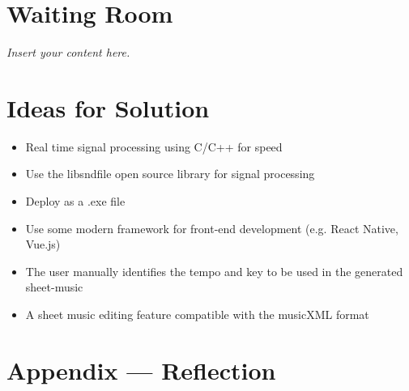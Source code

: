 \documentclass[12pt]{article}
\newcommand{\lips}{\textit{Insert your content here.}}
\begin{document}
\section{Waiting Room}

\lips

\section{Ideas for Solution}
\begin{itemize}
  \item Real time signal processing using C/C++ for speed
  \item Use the libsndfile open source library for signal processing
  \item Deploy as a .exe file
  \item Use some modern framework for front-end development (e.g. React Native, Vue.js)
  \item The user manually identifies the tempo and key to be used in the generated sheet-music
  \item A sheet music editing feature compatible with the musicXML format
\end{itemize}

\newpage{}



\newpage{}
\section*{Appendix --- Reflection}




\end{document}
